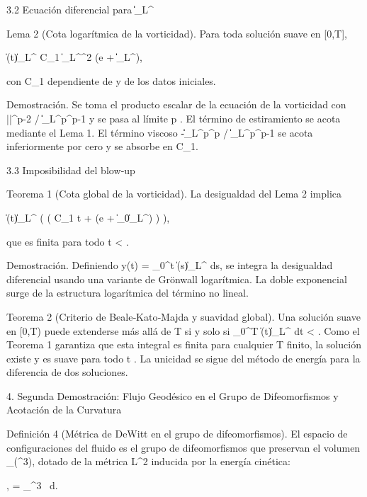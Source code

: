 \documentclass[12pt,a4paper]{book}
\begin{document}
3.2 Ecuación diferencial para \|\boldsymbol{\omega}\|_{L^\infty}

Lema 2 (Cota logarítmica de la vorticidad). Para toda solución suave en [0,T],

\|\boldsymbol{\omega}(t)\|_{L^\infty} \le C_1 \|\boldsymbol{\omega}\|_{L^\infty}^2 \log(e + \|\boldsymbol{\omega}\|_{L^\infty}),

con C_1 dependiente de \nu y de los datos iniciales.

Demostración. Se toma el producto escalar de la ecuación de la vorticidad con |\boldsymbol{\omega}|^{p-2}\boldsymbol{\omega} / \|\boldsymbol{\omega}\|_{L^p}^{p-1} y se pasa al límite p \to \infty. El término de estiramiento se acota mediante el Lema 1. El término viscoso -\nu\|\nabla\boldsymbol{\omega}\|_{L^p}^p / \|\boldsymbol{\omega}\|_{L^p}^{p-1} se acota inferiormente por cero y se absorbe en C_1.

3.3 Imposibilidad del blow‑up

Teorema 1 (Cota global de la vorticidad). La desigualdad del Lema 2 implica

\|\boldsymbol{\omega}(t)\|_{L^\infty} \le \exp\left( \exp\left( C_1 t + \ln\ln(e + \|\boldsymbol{\omega}_0\|_{L^\infty}) \right) \right),

que es finita para todo t < \infty.

Demostración. Definiendo y(t) = \int_0^t \|\boldsymbol{\omega}(s)\|_{L^\infty} ds, se integra la desigualdad diferencial usando una variante de Grönwall logarítmica. La doble exponencial surge de la estructura logarítmica del término no lineal.

Teorema 2 (Criterio de Beale‑Kato‑Majda y suavidad global). Una solución suave en [0,T) puede extenderse más allá de T si y solo si \int_0^T \|\boldsymbol{\omega}(t)\|_{L^\infty} dt < \infty. Como el Teorema 1 garantiza que esta integral es finita para cualquier T finito, la solución existe y es suave para todo t . La unicidad se sigue del método de energía para la diferencia de dos soluciones.

4. Segunda Demostración: Flujo Geodésico en el Grupo de Difeomorfismos y Acotación de la Curvatura

Definición 4 (Métrica de DeWitt en el grupo de difeomorfismos). El espacio de configuraciones del fluido es el grupo de difeomorfismos que preservan el volumen _\mu(^3), dotado de la métrica L^2 inducida por la energía cinética:

\langle {},  \rangle = \int_{^3} \cdot{} \, d.
\end{document}
